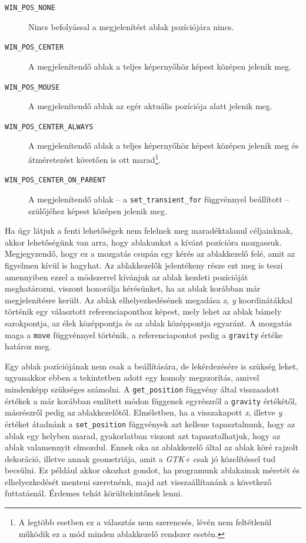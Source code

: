 \begin{description}
 \item[\texttt{WIN\_POS\_NONE}] Nincs befolyással a megjelenítést ablak pozíciójára nincs.
 \item[\texttt{WIN\_POS\_CENTER}] A megjelenítendő ablak a teljes képernyőhöz képest középen jelenik meg.
 \item[\texttt{WIN\_POS\_MOUSE}] A megjelenítendő ablak az egér aktuális pozíciója alatt jelenik meg.
 \item[\texttt{WIN\_POS\_CENTER\_ALWAYS}] A megjelenítendő ablak a teljes képernyőhöz képest középen jelenik meg és átméretezést követően is ott marad\footnote{A legtöbb esetben ez a választás nem szerencsés, lévén nem feltétlenül működik ez a mód minden ablakkezelő rendszer esetén.}.
 \item[\texttt{WIN\_POS\_CENTER\_ON\_PARENT}] A megjelenítendő ablak -- a \texttt{set\_transient\_for} függvénnyel beállított -- szülőjéhez képest középen jelenik meg.
\end{description}

Ha úgy látjuk a fenti lehetőségek nem felelnek meg maradéktalanul céljainknak, akkor lehetőségünk van arra, hogy ablakunkat a kívánt pozícióra mozgassuk. Megjegyzendő, hogy ez a mozgatás csupán egy kérés az ablakkezelő felé, amit az figyelmen kívül is hagyhat. Az ablakkezelők jelentékeny része ezt meg is teszi amennyiben ezzel a módszerrel kívánjuk az ablak kezdeti pozícióját meghatározni, viszont honorálja kérésünket, ha az ablak korábban már megjelenítésre került. Az ablak elhelyezkedésének megadása \textit{x}, \textit{y} koordinátákkal történik egy választott referenciaponthoz képest, mely lehet az ablak bámely sarokpontja, az élek középpontja és az ablak középpontja egyaránt. A mozgatás maga a \texttt{move} függvénnyel történik, a referenciapontot pedig a \texttt{gravity} értéke határoz meg.

Egy ablak pozíciójának nem csak a beállítására, de lekérdezésére is szükség lehet, ugyanakkor ebben a tekintetben adott egy komoly megszorítás, amivel mindenképp szükséges számolni. A \texttt{get\_position} függvény által visszaadott értékek a már korábban említett módon függenek egyrészről a \texttt{gravity} értékétől, másrészről pedig az ablakkezelőtől. Elméletben, ha a visszakapott \textit{x}, illetve \textit{y} értéket átadnánk a \texttt{set\_position} függvények azt kellene tapasztalnunk, hogy az ablak egy helyben marad, gyakorlatban viszont azt tapasztalhatjuk, hogy az ablak valamennyit elmozdul. Ennek oka az ablakkezelő által az ablak köré rajzolt dekoráció, illetve annak geometriája, amit a \textit{GTK+} csak jó közelítéssel tud becsülni. Ez például akkor okozhat gondot, ha programunk ablakainak méretét és elhelyezkedését menteni szeretnénk, majd azt visszaállítanánk a következő futtatásnál. Érdemes tehát körültekintőnek lenni.

